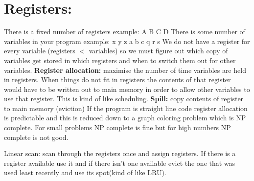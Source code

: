 \documentclass[twoside]{article}
\begin{document}
\section{Registers:}
There is a fixed number of registers example: A B C D
\newline
There is some number of variables in your program example: x y z a b c q r s
\newline
We do not have a register for every variable (registers $<$ variables) so we must figure out which copy of variables get stored in which registers and when to switch them out for other variables.
\newline\newline
\textbf{Register allocation:} maximise the number of time variables are held in registers. When things do not fit in registers the contents of that register would have to be written out to main memory in order to allow other variables to use that register. This is kind of like scheduling.
\newline
\textbf{Spill:} copy contents of register to main memory (eviction)
\newline
If the program is straight line code register allocation is predictable and this is reduced down to a graph coloring problem which is NP complete. For small problems NP complete is fine but for high numbers NP complete is not good.

Linear scan: scan through the registers once and assign registers. If there is a register available use it and if there isn't one available evict the one that was used least recently and use its spot(kind of like LRU). 
\end{document}
